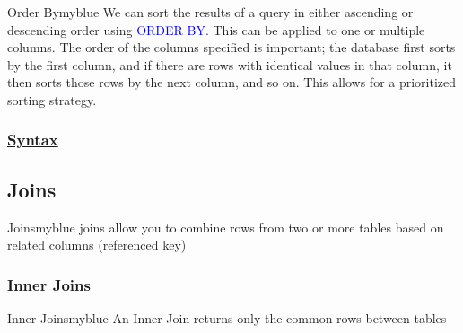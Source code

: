\begin{prettyBox}{Order By}{myblue}
We can sort the results of a query in either ascending or descending order using \textcolor{blue}{ORDER BY}. 
This can be applied to one or multiple columns. The order of the columns specified is important; the database
first sorts by the first column, and if there are rows with identical values in that column, it then sorts those
rows by the next column, and so on. This allows for a prioritized sorting strategy.
\end{prettyBox}

\vspace{0.25cm}
\subsubsection*{\underline{Syntax}}



\vspace{0.5cm}
\subsection{Joins}
\begin{prettyBox}{Joins}{myblue}
joins allow you to combine rows from two or more tables based on related columns (referenced key)
\end{prettyBox}

\vspace{0.25cm}
\subsubsection{Inner Joins}
\begin{prettyBox}{Inner Joins}{myblue}
An Inner Join returns only the common rows between tables
\begin{center}
\end{center}
\end{prettyBox}

\vspace{0.25cm}

